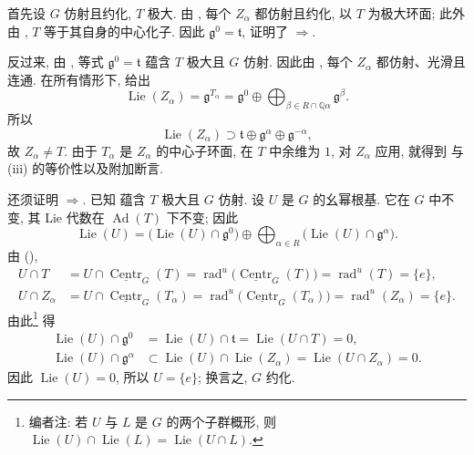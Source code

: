 首先设 \(G\) 仿射且约化, \(T\) 极大. 由 , 每个 \(Z_{\alpha}\) 都仿射且约化, 以 \(T\) 为极大环面; 此外由 , \(T\) 等于其自身的中心化子. 因此 \(\mathfrak g^{0}=\mathfrak t\), 证明了 \(\Rightarrow\).

反过来, 由 , 等式 \(\mathfrak g^{0}=\mathfrak t\) 蕴含 \(T\) 极大且 \(G\) 仿射. 因此由 , 每个 \(Z_{\alpha}\) 都仿射、光滑且连通. 在所有情形下,  给出
\[
  \operatorname{Lie}(Z_{\alpha})
  =
  \mathfrak g^{T_{\alpha}}
  =
  \mathfrak g^{0}
  \oplus
  \bigoplus_{\beta\in R\cap\mathbb Q\alpha}
    \mathfrak g^{\beta}.
\]
所以
\[
  \operatorname{Lie}(Z_{\alpha})
  \supset
  \mathfrak t\oplus
  \mathfrak g^{\alpha}\oplus
  \mathfrak g^{-\alpha},
\]
故 \(Z_{\alpha}\ne T\). 由于 \(T_{\alpha}\) 是 \(Z_{\alpha}\) 的中心子环面, 在 \(T\) 中余维为 \(1\), 对 \(Z_{\alpha}\) 应用, 就得到  与 (iii) 的等价性以及附加断言.

还须证明 \(\Rightarrow\). 已知  蕴含 \(T\) 极大且 \(G\) 仿射. 设 \(U\) 是 \(G\) 的幺幂根基. 它在 \(G\) 中不变, 其 Lie 代数在 \(\operatorname{Ad}(T)\) 下不变; 因此
\[
  \operatorname{Lie}(U)
  =
  \bigl(\operatorname{Lie}(U)\cap\mathfrak g^{0}\bigr)
  \oplus
  \bigoplus_{\alpha\in R}
    \bigl(\operatorname{Lie}(U)\cap\mathfrak g^{\alpha}\bigr).
\]
由 (),
\[
\begin{aligned}
  U\cap T
    &=
    U\cap\underline{\operatorname{Centr}}_{G}(T)
     =
    \operatorname{rad}^{u}
      \bigl(\underline{\operatorname{Centr}}_{G}(T)\bigr)
     =
    \operatorname{rad}^{u}(T)
     =
    \{e\},\\
  U\cap Z_{\alpha}
    &=
    U\cap\underline{\operatorname{Centr}}_{G}(T_{\alpha})
     =
    \operatorname{rad}^{u}
      \bigl(\underline{\operatorname{Centr}}_{G}(T_{\alpha})\bigr)
     =
    \operatorname{rad}^{u}(Z_{\alpha})
     =
    \{e\}.
\end{aligned}
\]
由此\footnote{编者注: 若 \(U\) 与 \(L\) 是 \(G\) 的两个子群概形, 则 \(\operatorname{Lie}(U)\cap\operatorname{Lie}(L)=\operatorname{Lie}(U\cap L)\).} 得
\[
\begin{aligned}
  \operatorname{Lie}(U)\cap\mathfrak g^{0}
    &=
    \operatorname{Lie}(U)\cap\mathfrak t
     =
    \operatorname{Lie}(U\cap T)
     =
    0,\\
  \operatorname{Lie}(U)\cap\mathfrak g^{\alpha}
    &\subset
    \operatorname{Lie}(U)\cap\operatorname{Lie}(Z_{\alpha})
     =
    \operatorname{Lie}(U\cap Z_{\alpha})
     =
    0.
\end{aligned}
\]
因此 \(\operatorname{Lie}(U)=0\), 所以 \(U=\{e\}\); 换言之, \(G\) 约化.

